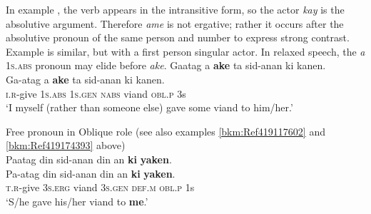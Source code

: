 In example , the verb appears in the intransitive form, so the actor \textit{kay} is the absolutive argument. Therefore \textit{ame} is not ergative; rather it occurs after the absolutive pronoun of the same person and number to express strong contrast. Example  is similar, but with a first person singular actor. In relaxed speech, the \textit{a} 1\textsc{s.abs} pronoun may elide before \textit{ake}.
\ea
\label{bkm:Ref419174393}
Gaatag   a  \textbf{ake}  ta  sid-anan  ki  kanen. \\\smallskip
 \gll Ga-atag   a  \textbf{ake}  ta  sid-anan  ki  kanen. \\
\textsc{i.r}-give  1\textsc{s.abs} 1\textsc{s.gen}  \textsc{nabs}  viand  \textsc{obl.p}  3s \\
\glt ‘I myself (rather than someone else) gave some viand to him/her.’
\z

\ea
\label{bkm:Ref420429206}  
Free pronoun in Oblique role (see also examples \ref{bkm:Ref419117602} and \ref{bkm:Ref419174393} above) \\
Paatag   din   sid-anan  din   an \textbf{ki}  \textbf{yaken}. \\\smallskip
 \gll Pa-atag   din   sid-anan  din   an \textbf{ki}  \textbf{yaken}. \\
\textsc{t.r}-give  3\textsc{s.erg}  viand  3\textsc{s.gen}  \textsc{def.m}  \textsc{obl.p}  1s \\
\glt ‘S/he gave his/her viand to \textbf{me}.’
\z

